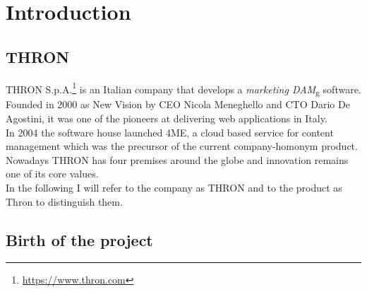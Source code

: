 \chapter{Introduction}
\label{chap:introduction}


\section{THRON}

THRON S.p.A.\footnote{\url{https://www.thron.com}} is an Italian company that develops a \emph{\gls{marketing DAM}}\textsubscript{g} software. Founded in 2000 as New Vision by CEO Nicola Meneghello and CTO Dario De Agostini, it was one of the pioneers at delivering web applications in Italy. \\
In 2004 the software house launched 4ME, a cloud based service for content management which was the precursor of the current company-homonym product. \\
Nowadays THRON has four premises around the globe and innovation remains one of its core values.\\
In the following I will refer to the company as THRON and to the product as Thron to distinguish them.

\section{Birth of the project}

